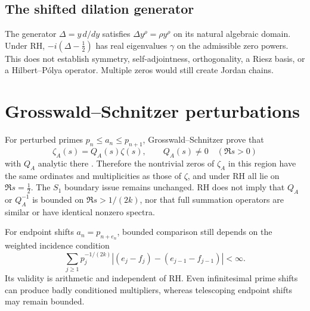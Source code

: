 \documentclass[12pt,letterpaper]{article}
\numberwithin{equation}{section}
\theoremstyle{definition}
\begin{document}
\subsection{The shifted dilation generator}
The generator $\Delta=y\,d/dy$ satisfies
$\Delta y^\rho=\rho y^\rho$ on its natural algebraic domain.
Under RH, $-i(\Delta-\tfrac12)$ has real eigenvalues $\gamma$
on the admissible zero powers. This does not establish symmetry,
self-adjointness, orthogonality, a Riesz basis, or a Hilbert--P\'olya
operator. Multiple zeros would still create Jordan chains.

\section{Grosswald--Schnitzer perturbations}
For perturbed primes $p_n\le a_n\le p_{n+1}$,
Grosswald--Schnitzer prove that
\begin{equation}\label{eq:quotient}
 \zeta_A(s)=Q_A(s)\zeta(s),\qquad Q_A(s)\ne0
 \quad(\Re s>0)
\end{equation}
with $Q_A$ analytic there \cite{GS78}. Therefore the
nontrivial zeros of $\zeta_A$ in this region have
the same ordinates and multiplicities as those of $\zeta$,
and under RH all lie on $\Re s=\tfrac12$.
The $S_1$ boundary issue remains unchanged.
RH does not imply that $Q_A$ or $Q_A^{-1}$ is bounded
on $\Re s>1/(2k)$, nor that full summation operators
are similar or have identical nonzero spectra.

For endpoint shifts $a_n=p_{n+e_n}$, bounded comparison
still depends on the weighted incidence condition
\begin{equation}\label{eq:boundary}
 \sum_{j\ge1}p_j^{-1/(2k)}
 |(e_j-f_j)-(e_{j-1}-f_{j-1})|<\infty.
\end{equation}
Its validity is arithmetic and independent of RH.
Even infinitesimal prime shifts can produce badly
conditioned multipliers, whereas telescoping endpoint
shifts may remain bounded.
\end{document}
